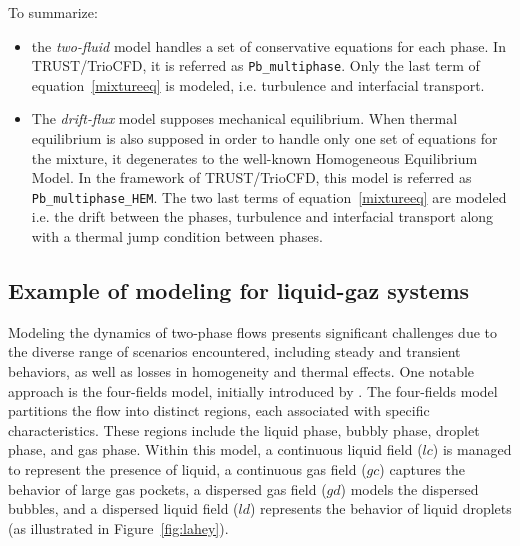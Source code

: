 To summarize:
\begin{itemize}
  \item[\small \textcolor{blue}{\ding{109}}] the \emph{two-fluid} model handles a set of conservative equations for each phase. In TRUST/TrioCFD, it is referred as \texttt{Pb\_multiphase}. Only the last term of equation~\ref{mixtureeq} is modeled, i.e. turbulence and interfacial transport.
  \item[\small \textcolor{blue}{\ding{109}}] The \emph{drift-flux} model supposes mechanical equilibrium. When thermal equilibrium is also supposed in order to handle only one set of equations for the mixture, it degenerates to the well-known Homogeneous Equilibrium Model. In the framework of TRUST/TrioCFD, this model is referred as \texttt{Pb\_multiphase\_HEM}. The two last terms of equation~\ref{mixtureeq} are modeled i.e. the drift between the phases, turbulence and interfacial transport along with a thermal jump condition between phases.
\end{itemize}

\subsection{Example of modeling for liquid-gaz systems}

Modeling the dynamics of two-phase flows presents significant challenges due to the diverse range of scenarios encountered, including steady and transient behaviors, as well as losses in homogeneity and thermal effects. One notable approach is the four-fields model, initially introduced by \textcite{Lahey2001}. The four-fields model partitions the flow into distinct regions, each associated with specific characteristics. These regions include the liquid phase, bubbly phase, droplet phase, and gas phase. Within this model, a continuous liquid field ($lc$) is managed to represent the presence of liquid, a continuous gas field ($gc$) captures the behavior of large gas pockets, a dispersed gas field ($gd$) models the dispersed bubbles, and a dispersed liquid field ($ld$) represents the behavior of liquid droplets (as illustrated in Figure~\ref{fig:lahey}).

